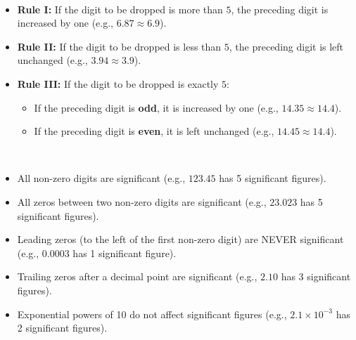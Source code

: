 \documentclass[11pt,a4paper]{article}
\begin{document}
\vspace{5pt}
\noindent{\large\textbf{\textsf{\textcolor{primaryDark}{1.6 Rules for Rounding Off Numbers (From Notes)}}}}\\[3pt]
\begin{itemize}[leftmargin=14pt,itemsep=1pt]
  \item \textbf{Rule I:} If the digit to be dropped is more than $5$, the preceding digit is increased by one (e.g., $6.87 \approx 6.9$).
  \item \textbf{Rule II:} If the digit to be dropped is less than $5$, the preceding digit is left unchanged (e.g., $3.94 \approx 3.9$).
  \item \textbf{Rule III:} If the digit to be dropped is exactly $5$:
    \begin{itemize}[leftmargin=12pt,itemsep=1pt]
      \item If the preceding digit is \textbf{odd}, it is increased by one (e.g., $14.35 \approx 14.4$).
      \item If the preceding digit is \textbf{even}, it is left unchanged (e.g., $14.45 \approx 14.4$).
    \end{itemize}
\end{itemize}

\vspace{5pt}
\noindent{\large\textbf{\textsf{\textcolor{primaryDark}{1.7 Rules for Significant Figures}}}}\\[3pt]
\begin{itemize}[leftmargin=14pt,itemsep=1pt]
  \item All non-zero digits are significant (e.g., $123.45$ has 5 significant figures).
  \item All zeros between two non-zero digits are significant (e.g., $23.023$ has 5 significant figures).
  \item Leading zeros (to the left of the first non-zero digit) are NEVER significant (e.g., $0.0003$ has 1 significant figure).
  \item Trailing zeros after a decimal point are significant (e.g., $2.10$ has 3 significant figures).
  \item Exponential powers of 10 do not affect significant figures (e.g., $2.1 \times 10^{-3}$ has 2 significant figures).
\end{itemize}
\end{document}
